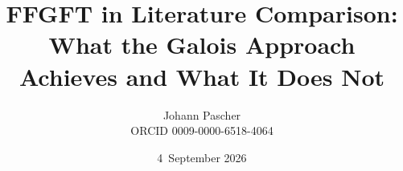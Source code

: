 \documentclass[11pt,a4paper]{report}
\title{FFGFT in Literature Comparison:\\[0.5em]
  \large What the Galois Approach Achieves and What It Does Not}
\date{4~September 2026}
\author{Johann Pascher\\\small ORCID 0009-0000-6518-4064}
\begin{document}
\renewcommand{\thechapter}{}
\renewcommand{\thesection}{\arabic{section}}
\maketitle
\tableofcontents

\end{document}
